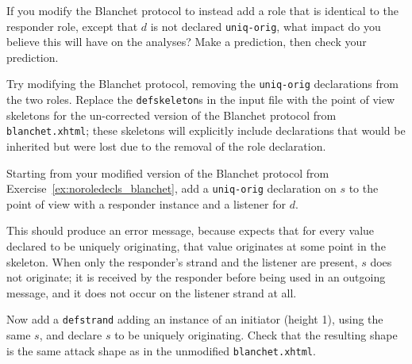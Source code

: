 \begin{exercise}
  If you modify the Blanchet protocol to instead add a role that is
  identical to the responder role, except that $d$ is not declared
  \texttt{uniq-orig}, what impact do you believe this will have on the
  analyses?  Make a prediction, then check your prediction.
\end{exercise}

\begin{exercise}
\label{ex:noroledecls_blanchet}
Try modifying the Blanchet protocol, removing the \texttt{uniq-orig}
declarations from the two roles.  Replace the \texttt{defskeleton}s in
the input file with the point of view skeletons for the un-corrected
version of the Blanchet protocol from \texttt{blanchet.xhtml}; these
skeletons will explicitly include declarations that would be inherited
but were lost due to the removal of the role declaration.
\end{exercise}

\begin{exercise}
Starting from your modified version of the Blanchet protocol from
Exercise~\ref{ex:noroledecls_blanchet}, add a \texttt{uniq-orig} declaration
on $s$ to the point of view with a responder instance and a listener for $d$.

This should produce an error message, because {\cpsa} expects that for
every value declared to be uniquely originating, that value originates
at some point in the skeleton.  When only the responder's strand and
the listener are present, $s$ does not originate; it is received by
the responder before being used in an outgoing message, and it does
not occur on the listener strand at all.

Now add a \texttt{defstrand} adding an instance of an initiator
(height 1), using the same $s$, and declare $s$ to be uniquely
originating.  Check that the resulting shape is the same attack shape
as in the unmodified \texttt{blanchet.xhtml}.
\end{exercise}


